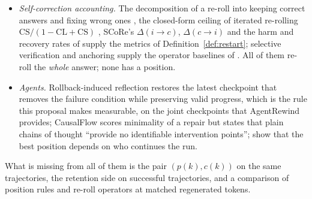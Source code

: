 \documentclass[10pt,a4paper]{article}
\begin{document}
\begin{itemize}[leftmargin=1.1em]
\item \emph{Self-correction accounting.} The decomposition of a re-roll into keeping correct answers and fixing wrong ones \cite{yang2024confcrit,huang2024cannot,kamoi2024survey}, the closed-form ceiling of iterated re-rolling $\mathrm{CS}/(1-\mathrm{CL}+\mathrm{CS})$ \cite{yang2025scaling}, SCoRe's $\Delta(i{\to}c)$, $\Delta(c{\to}i)$ \cite{kumar2025score} and the harm and recovery rates of \citet{zhang2026riskaware} supply the metrics of Definition~\ref{def:restart}; selective verification \cite{dip2026thinkagain} and anchoring \cite{verma2026tryagain} supply the operator baselines of . All of them re-roll the \emph{whole} answer; none has a position.
\item \emph{Agents.} Rollback-induced reflection \cite{yu2026rir} restores the latest checkpoint that removes the failure condition while preserving valid progress, which is the rule this proposal makes measurable, on the joint checkpoints that AgentRewind \cite{zhuang2026agentrewind} provides; CausalFlow \cite{bonagiri2026causalflow} scores minimality of a repair but states that plain chains of thought ``provide no identifiable intervention points''; \citet{liao2026repairs} show that the best position depends on who continues the run.
\end{itemize}
What is missing from all of them is the pair $(p(k),c(k))$ on the same trajectories, the retention side on successful trajectories, and a comparison of position rules and re-roll operators at matched regenerated tokens.
\end{document}
